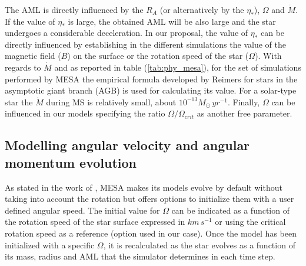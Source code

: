 \documentclass[fleqn,usenatbib]{mnras}
\begin{document}
The AML is directly influenced by the $R_A$ (or alternatively by the $\eta_*$), $\Omega$ and $\Dot{M}$. If the value of $\eta_*$ is large, the obtained AML will be also large and the star undergoes a considerable deceleration. In our proposal, the value of $\eta_*$ can be directly influenced by establishing in the different simulations the value of the magnetic field ($B$) on the surface or the rotation speed of the star ($\Omega$). With regards to $\Dot{M}$ and as reported in table (\ref{tab:phy_mesa}), for the set of simulations performed by MESA the empirical formula developed by Reimers for stars in the asymptotic giant branch (AGB) is used for calculating its value. For a solar-type star the $\Dot{M}$ during MS is relatively small, about  $10^{-13}M_{\odot} \, yr^{-1}$. Finally, $\Omega$ can be influenced in our models specifying the ratio $\Omega / \Omega_{crit}$ as another free parameter. 

\subsection{Modelling angular velocity and angular momentum evolution} \label{mod_ang_vel_ang_mom}
As stated in the work of \citet{Paxton2015}, MESA makes its models evolve by default without taking into account the rotation but offers options to initialize them with a user defined angular speed. The initial value for $\Omega$ can be indicated as a function of the rotation speed of the star surface expressed in $km\,s^{-1}$ or using the critical rotation speed as a reference (option used in our case).  Once the model has been initialized with a specific $\Omega$, it is recalculated as the star evolves as a function of its mass, radius and AML that the simulator determines in each time step. \par
\end{document}
